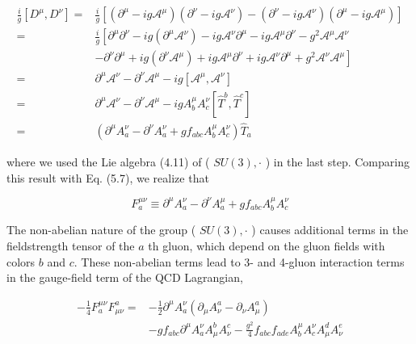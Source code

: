 \documentclass[10pt, letterpaper]{article}
\begin{document}
$$
\begin{aligned}
\frac{i}{g}\left[D^{\mu}, D^{\nu}\right]= & \frac{i}{g}\left[\left(\partial^{\mu}-i g \mathcal{A}^{\mu}\right)\left(\partial^{\nu}-i g \mathcal{A}^{\nu}\right)-\left(\partial^{\nu}-i g \mathcal{A}^{\nu}\right)\left(\partial^{\mu}-i g \mathcal{A}^{\mu}\right)\right] \\
= & \frac{i}{g}\left[\partial^{\mu} \partial^{\nu}-i g\left(\partial^{\mu} \mathcal{A}^{\nu}\right)-i g \mathcal{A}^{\nu} \partial^{\mu}-i g \mathcal{A}^{\mu} \partial^{\nu}-g^{2} \mathcal{A}^{\mu} \mathcal{A}^{\nu}\right. \\
& \left.-\partial^{\nu} \partial^{\mu}+i g\left(\partial^{\nu} \mathcal{A}^{\mu}\right)+i g \mathcal{A}^{\mu} \partial^{\nu}+i g \mathcal{A}^{\nu} \partial^{\mu}+g^{2} \mathcal{A}^{\nu} \mathcal{A}^{\mu}\right] \\
= & \partial^{\mu} \mathcal{A}^{\nu}-\partial^{\nu} \mathcal{A}^{\mu}-i g\left[\mathcal{A}^{\mu}, \mathcal{A}^{\nu}\right] \\
= & \partial^{\mu} \mathcal{A}^{\nu}-\partial^{\nu} \mathcal{A}^{\mu}-i g A_{b}^{\mu} A_{c}^{\nu}\left[\hat{T}^{b}, \hat{T}^{c}\right] \\
= & \left(\partial^{\mu} A_{a}^{\nu}-\partial^{\nu} A_{a}^{\nu}+g f_{a b c} A_{b}^{\mu} A_{c}^{\nu}\right) \hat{T}_{a}
\end{aligned}
$$

where we used the Lie algebra (4.11) of ( $S U(3), \cdot$ ) in the last step. Comparing this result with Eq. (5.7), we realize that

$$
F_{a}^{\mu \nu} \equiv \partial^{\mu} A_{a}^{\nu}-\partial^{\nu} A_{a}^{\mu}+g f_{a b c} A_{b}^{\mu} A_{c}^{\nu}
$$

The non-abelian nature of the group ( $S U(3), \cdot$ ) causes additional terms in the fieldstrength tensor of the $a$ th gluon, which depend on the gluon fields with colors $b$ and $c$. These non-abelian terms lead to 3- and 4-gluon interaction terms in the gauge-field term of the QCD Lagrangian,

$$
\begin{aligned}
-\frac{1}{4} F_{a}^{\mu \nu} F_{\mu \nu}^{a}= & -\frac{1}{2} \partial^{\mu} A_{a}^{\nu}\left(\partial_{\mu} A_{\nu}^{a}-\partial_{\nu} A_{\mu}^{a}\right) \\
& -g f_{a b c} \partial^{\mu} A_{a}^{\nu} A_{\mu}^{b} A_{\nu}^{c}-\frac{g^{2}}{4} f_{a b c} f_{a d e} A_{b}^{\mu} A_{c}^{\nu} A_{\mu}^{d} A_{\nu}^{e}
\end{aligned}
$$
\end{document}
